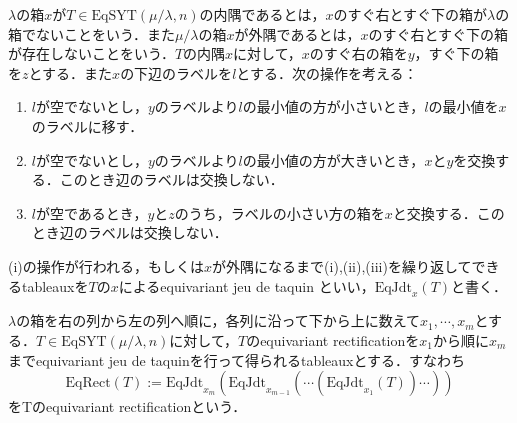 \begin{defin}
  $\lambda$の箱$x$が$T\in\text{EqSYT}(\mu/\lambda, n)$の内隅であるとは，$x$のすぐ右とすぐ下の箱が$\lambda$の箱でないことをいう．また$\mu/\lambda$の箱$x$が外隅であるとは，$x$のすぐ右とすぐ下の箱が存在しないことをいう．$T$の内隅$x$に対して，$x$のすぐ右の箱を$y$，すぐ下の箱を$z$とする．また$x$の下辺のラベルを$l$とする．次の操作を考える：
  \begin{enumerate}
    \item $l$が空でないとし，$y$のラベルより$l$の最小値の方が小さいとき，$l$の最小値を$x$のラベルに移す．
    \item $l$が空でないとし，$y$のラベルより$l$の最小値の方が大きいとき，$x$と$y$を交換する．このとき辺のラベルは交換しない．
    \item $l$が空であるとき，$y$と$z$のうち，ラベルの小さい方の箱を$x$と交換する．このとき辺のラベルは交換しない．
  \end{enumerate}
  (i)の操作が行われる，もしくは$x$が外隅になるまで(i),(ii),(iii)を繰り返してできるtableauxを$T$の$x$によるequivariant jeu de taquin といい，$\text{EqJdt}_x(T)$と書く．
\end{defin}

\begin{defin}
  $\lambda$の箱を右の列から左の列へ順に，各列に沿って下から上に数えて$x_1,\cdots,x_m$とする．$T\in\text{EqSYT}(\mu/\lambda, n)$に対して，$T$のequivariant rectificationを$x_1$から順に$x_m$までequivariant jeu de taquinを行って得られるtableauxとする．すなわち
  \[
  \text{EqRect}(T):=\text{EqJdt}_{x_m}(\text{EqJdt}_{x_{m-1}}(\cdots(\text{EqJdt}_{x_1}(T))\cdots))
  \]
  をTのequivariant rectificationという．
\end{defin}

